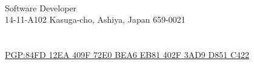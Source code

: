 \documentclass{cv_style_yui}
\begin{document}

\begin{center} 
   \\
  Software Developer \\
  14-11-A102 Kasuga-cho, Ashiya, Japan 659-0021 \\
   \\
   \\
  \href{https://ynishiza.github.io/data/public.asc}{PGP:84FD 12EA 409F 72E0 BEA6 EB81 402F 3AD9 D851 C422}  \\
    \\
   \\
\end{center}


\vphantom{A}

\vphantom{A}

\vphantom{A}

\end{document}
